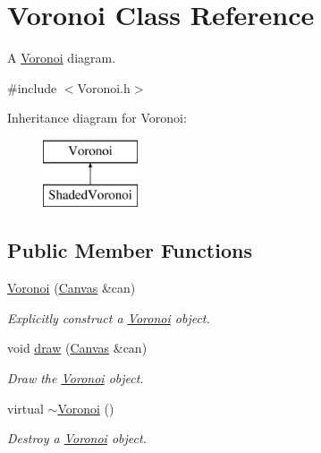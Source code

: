 \hypertarget{class_voronoi}{}\section{Voronoi Class Reference}
\label{class_voronoi}


A \hyperlink{class_voronoi}{Voronoi} diagram.  




{\ttfamily \#include $<$Voronoi.\+h$>$}

Inheritance diagram for Voronoi\+:\begin{figure}[H]
\begin{center}
\leavevmode
\includegraphics[height=2.000000cm]{class_voronoi}
\end{center}
\end{figure}
\subsection*{Public Member Functions}
\begin{DoxyCompactItemize}
\item 
\hyperlink{class_voronoi_a09fc8a28d40e4e7f5abda0ec25e8785d}{Voronoi} (\hyperlink{classtsgl_1_1_canvas}{Canvas} \&can)
\begin{DoxyCompactList}\small\item\em Explicitly construct a \hyperlink{class_voronoi}{Voronoi} object. \end{DoxyCompactList}\item 
void \hyperlink{class_voronoi_a8455f7017a285ff1859829202970f071}{draw} (\hyperlink{classtsgl_1_1_canvas}{Canvas} \&can)
\begin{DoxyCompactList}\small\item\em Draw the \hyperlink{class_voronoi}{Voronoi} object. \end{DoxyCompactList}\item 
virtual \hyperlink{class_voronoi_a9f4428492a0608030343ffbd4bb8d9ae}{$\sim$\+Voronoi} ()
\begin{DoxyCompactList}\small\item\em Destroy a \hyperlink{class_voronoi}{Voronoi} object. \end{DoxyCompactList}\end{DoxyCompactItemize}
